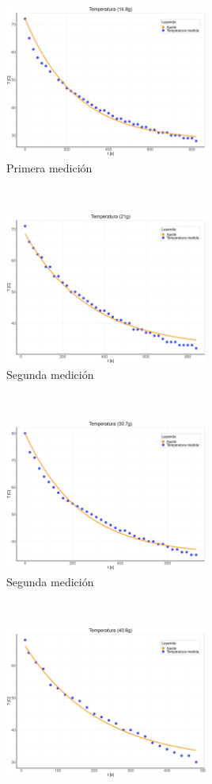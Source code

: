\documentclass{article}
\begin{document}
\begin{figure}[H]
    \centering
    \begin{subfigure}[t]{0.5\textwidth}
        \centering
        \includegraphics[height=5cm]{media/Tvt_1.png}
        \caption{Primera medición}
    \end{subfigure}%
    ~ 
    \begin{subfigure}[t]{0.5\textwidth}
        \centering
        \includegraphics[height=5cm]{media/Tvt_2.png}
        \caption{Segunda medición}
    \end{subfigure}
    ~ 
    \begin{subfigure}[t]{0.5\textwidth}
        \centering
        \includegraphics[height=5cm]{media/Tvt_3.png}
        \caption{Segunda medición}
    \end{subfigure}
    ~ 
    \begin{subfigure}[t]{0.5\textwidth}
        \centering
        \includegraphics[height=5cm]{media/Tvt_4.png}

\end{subfigure}
\end{figure}
\end{document}
